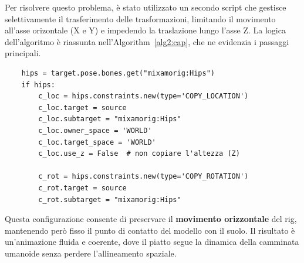 Per risolvere questo problema, è stato utilizzato un secondo script che gestisce selettivamente il trasferimento delle trasformazioni, limitando il movimento all'asse orizontale (X e Y) e impedendo la traslazione lungo l'asse Z. La logica dell'algoritmo è riassunta nell'Algorithm~\ref{alg2:cap}, che ne evidenzia i passaggi principali.
\vspace{2mm} %
\begin{verbatim}
    hips = target.pose.bones.get("mixamorig:Hips")
    if hips:
        c_loc = hips.constraints.new(type='COPY_LOCATION')
        c_loc.target = source
        c_loc.subtarget = "mixamorig:Hips"
        c_loc.owner_space = 'WORLD'
        c_loc.target_space = 'WORLD'
        c_loc.use_z = False  # non copiare l'altezza (Z)
    
        c_rot = hips.constraints.new(type='COPY_ROTATION')
        c_rot.target = source
        c_rot.subtarget = "mixamorig:Hips"
\end{verbatim}
\vspace{5mm} %
Questa configurazione consente di preservare il \textbf{movimento orizzontale} del rig, mantenendo però fisso il punto di contatto del modello con il suolo. Il risultato è un'animazione fluida e coerente, dove il piatto segue la dinamica della camminata umanoide senza perdere l'allineamento spaziale.

